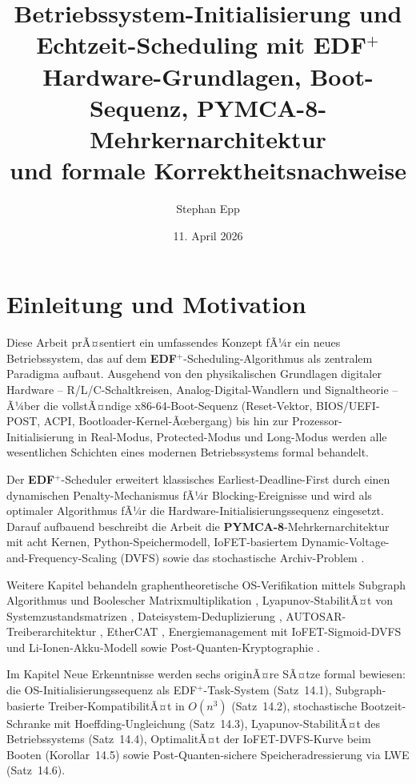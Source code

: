 ﻿\documentclass[a4paper,12pt]{scrreprt}
\title{%
	\textbf{Betriebssystem-Initialisierung und\\
		Echtzeit-Scheduling mit EDF$^+$}\\[0.4em]
	\large Hardware-Grundlagen, Boot-Sequenz, PYMCA-8-Mehrkernarchitektur\\
	und formale Korrektheitsnachweise
}
\author{Stephan Epp}
\date{11. April 2026}
\theoremstyle{definition}
\begin{document}
	
	\maketitle
	\tableofcontents
	\newpage
	
	\chapter{Einleitung und Motivation}
	
	Diese Arbeit prÃ¤sentiert ein umfassendes Konzept fÃ¼r ein neues Betriebssystem, das
	auf dem \textbf{EDF$^+$}-Scheduling-Algorithmus \cite{Epp2026edfplus} als zentralem
	Paradigma aufbaut. Ausgehend von den physikalischen Grundlagen digitaler Hardware --
	R/L/C-Schaltkreisen, Analog-Digital-Wandlern und Signaltheorie -- Ã¼ber die
	vollstÃ¤ndige x86-64-Boot-Sequenz (Reset-Vektor, BIOS/UEFI-POST, ACPI,
	Bootloader-Kernel-Ãœbergang) bis hin zur Prozessor-Initialisierung in
	Real-Modus, Protected-Modus und Long-Modus werden alle wesentlichen Schichten
	eines modernen Betriebssystems formal behandelt.
	
	Der \textbf{EDF$^+$}-Scheduler erweitert klassisches Earliest-Deadline-First
	durch einen dynamischen Penalty-Mechanismus fÃ¼r Blocking-Ereignisse und
	wird als optimaler Algorithmus fÃ¼r die Hardware-Initialisierungssequenz
	eingesetzt. Darauf aufbauend beschreibt die Arbeit die
	\textbf{PYMCA-8}-Mehrkernarchitektur \cite{Epp2026pymca8} mit acht Kernen,
	Python-Speichermodell, IoFET-basiertem Dynamic-Voltage-and-Frequency-Scaling
	(DVFS) sowie das stochastische Archiv-Problem \cite{Epp2026archv}.
	
	Weitere Kapitel behandeln graphentheoretische OS-Verifikation mittels
	Subgraph Algorithmus \cite{Epp2026subgraph} und Boolescher Matrixmultiplikation
	\cite{Epp2026boolmm}, Lyapunov-StabilitÃ¤t von Systemzustandsmatrizen
	\cite{Epp2026sysstate}, Dateisystem-Deduplizierung \cite{Epp2026dusgraph},
	AUTOSAR-Treiber\-architektur \cite{Epp2026autsre}, EtherCAT \cite{Epp2026ethercate},
	Energiemanagement mit IoFET-Sigmoid-DVFS und Li-Ionen-Akku-Modell
	\cite{Epp2026liionp,Epp2026iono} sowie Post-Quanten-Kryptographie
	\cite{Epp2026pqc}.
	
	Im Kapitel Neue Erkenntnisse werden sechs originÃ¤re SÃ¤tze formal bewiesen:
	die OS-Initialisierungssequenz als EDF$^+$-Task-System (Satz~14.1),
	Subgraph-basierte Treiber-KompatibilitÃ¤t in $O(n^3)$ (Satz~14.2),
	stochastische Bootzeit-Schranke mit Hoeffding-Ungleichung (Satz~14.3),
	Lyapunov-StabilitÃ¤t des Betriebssystems (Satz~14.4),
	OptimalitÃ¤t der IoFET-DVFS-Kurve beim Booten (Korollar~14.5) sowie
	Post-Quanten-sichere Speicheradressierung via LWE (Satz~14.6).
	
\end{document}
